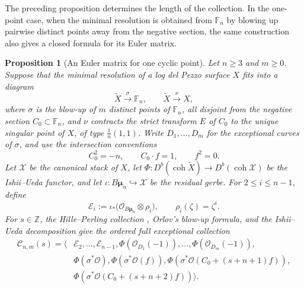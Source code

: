 \documentclass[11pt]{article}
\theoremstyle{plain}
\newtheorem{proposition}[proposition]{Proposition}
\theoremstyle{definition}
\theoremstyle{remark}
\newcommand{\F}{\mathbb F}
\newcommand{\Z}{\mathbb Z}
\newcommand{\Db}{D^b}
\newcommand{\coh}{\operatorname{coh}}
\newcommand{\XX}{\mathcal X}
\newcommand{\OO}{\mathcal O}
\begin{document}
The preceding proposition determines the length of the collection. In the
one-point case, when the minimal resolution is obtained from \(\F_n\) by
blowing up pairwise distinct points away from the negative section, the same
construction also gives a closed formula for its Euler matrix.

\begin{proposition}[An Euler matrix for one cyclic point]
\label{prop:general-one-point-euler}
Let \(n\geq3\) and \(m\geq0\). Suppose that the minimal resolution of a log
del Pezzo surface \(X\) fits into a diagram
\[
\widetilde X\xrightarrow{\ \sigma\ }\F_n,
\qquad
\widetilde X\xrightarrow{\ \nu\ }X,
\]
where \(\sigma\) is the blow-up of \(m\) distinct points of \(\F_n\), all
disjoint from the negative section \(C_0\subset\F_n\), and \(\nu\)
contracts the strict transform \(E\) of \(C_0\) to the unique singular point
of \(X\), of type \(\frac1n(1,1)\). Write \(D_1,\dots,D_m\) for the
exceptional curves of \(\sigma\), and use the intersection conventions
\[
C_0^2=-n,
\qquad
C_0\cdot f=1,
\qquad
f^2=0.
\]
Let \(\XX\) be the canonical stack of \(X\), let
\(\Phi:\Db(\coh\widetilde X)\to\Db(\coh\XX)\) be the Ishii--Ueda functor,
and let \(\iota:B\boldsymbol{\mu}_n\hookrightarrow\XX\) be the residual
gerbe. For \(2\leq i\leq n-1\), define
\[
\mathcal E_i
:=
\iota_*\bigl(\OO_{B\boldsymbol{\mu}_n}\otimes\rho_i\bigr),
\qquad
\rho_i(\zeta)=\zeta^i.
\]
For \(s\in\Z\), the Hille--Perling collection
\cite[Proposition~5.2]{HillePerling2011}, Orlov's blow-up formula, and the
Ishii--Ueda decomposition give the ordered full exceptional collection
\[
\begin{aligned}
\mathcal C_{n,m}(s)=\big\langle
&\mathcal E_2,\dots,\mathcal E_{n-1},
\Phi(\OO_{D_1}(-1)),\dots,\Phi(\OO_{D_m}(-1)),\\
&\Phi(\sigma^*\OO),\Phi(\sigma^*\OO(f)),
\Phi(\sigma^*\OO(C_0+(s+n+1)f)),\\
&\Phi(\sigma^*\OO(C_0+(s+n+2)f))
\big\rangle .
\end{aligned}
\]


\end{proposition}
\end{document}
